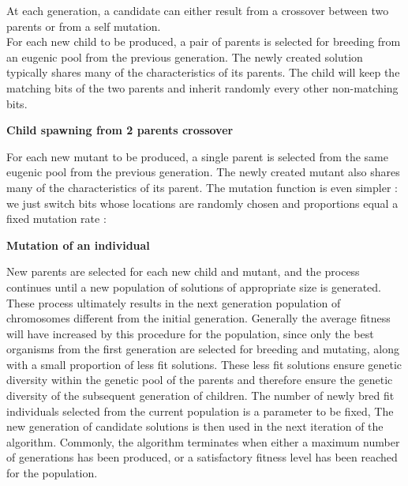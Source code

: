 \documentclass{iSWAGArticle}
\begin{document}
  At each generation, a candidate can either result from a crossover between two parents or from a self mutation.
  \\\newline
  For each new child to be produced, a pair of parents is selected for breeding from an eugenic pool from the previous generation. 
  The newly created solution typically shares many of the characteristics of its parents. 
  The child will keep the matching bits of the two parents and inherit randomly every other non-matching bits.
  \begin{center}
  \textbf{\large Child spawning from 2 parents crossover}
  \end{center}
  \begin{center}
  \end{center}
  For each new mutant to be produced, a single parent is selected from the same eugenic pool from the previous generation. 
  The newly created mutant also shares many of the characteristics of its parent. 
  The mutation function is even simpler : we just switch bits whose locations are randomly chosen
  and proportions equal a fixed mutation rate : 
  \\\newline
  \begin{center}
  \textbf{\large Mutation of an individual}
  \end{center}
  \begin{center}
  \end{center}
  New parents are selected for each new child and mutant, and the process continues until a new population of solutions of appropriate size is generated.
  These process ultimately results in the next generation population of chromosomes different from the initial generation. 
  Generally the average fitness will have increased by this procedure for the population, 
  since only the best organisms from the first generation are selected for breeding and mutating, along with a small proportion of less fit solutions.
  These less fit solutions ensure genetic diversity within the genetic pool of the parents and therefore ensure the genetic diversity of the subsequent generation of children.
  The number of newly bred fit individuals selected from the current population is a parameter to be fixed, 
  The new generation of candidate solutions is then used in the next iteration of the algorithm. 
  Commonly, the algorithm terminates when either a maximum number of generations has been produced, or a satisfactory fitness level has been reached for the population.
\end{document}
